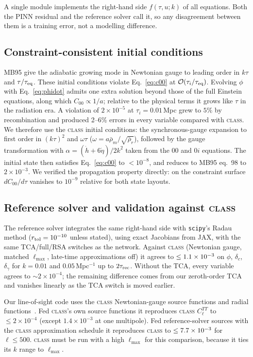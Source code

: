\documentclass[prd,twocolumn,superscriptaddress,nofootinbib,floatfix]{revtex4-2}
\newcommand{\taurec}{\tau_{\rm rec}}
\begin{document}
A single module implements the right-hand side $f(\tau,u;k)$ of all equations. Both the PINN residual and the reference solver call it, so any disagreement between them is a training error, not a modelling difference.

\subsection{Constraint-consistent initial conditions}\label{sec:ics}
MB95 give the adiabatic growing mode in Newtonian gauge to leading order in $k\tau$ and $\tau/\tau_{\rm eq}$. These initial conditions violate Eq.~\eqref{eq:c00} at $\mathcal{O}(\tau_i/\tau_{\rm eq})$. Evolving $\phi$ with Eq.~\eqref{eq:phidot} admits one extra solution beyond those of the full Einstein equations, along which $C_{00}\propto 1/a$; relative to the physical terms it grows like $\tau$ in the radiation era. A violation of $2\times10^{-5}$ at $\tau_i=0.01$\,Mpc grew to $5\%$ by recombination and produced 2--6\% errors in every variable compared with \textsc{class}. We therefore use the \textsc{class} initial conditions: the synchronous-gauge expansion to first order in $(k\tau)^2$ and $\omega\tau$ ($\omega=a\bar\rho_m/\sqrt{\bar\rho_r}$), followed by the gauge transformation with $\alpha=(\dot h+6\dot\eta)/2k^2$ taken from the $00$ and $0i$ equations. The initial state then satisfies Eq.~\eqref{eq:c00} to $<10^{-8}$, and reduces to MB95 eq.~98 to $2\times10^{-3}$. We verified the propagation property directly: on the constraint surface $dC_{00}/d\tau$ vanishes to $10^{-9}$ relative for both state layouts.

\subsection{Reference solver and validation against \textsc{class}}
The reference solver integrates the same right-hand side with \texttt{scipy}'s Radau method ($r_{\rm tol}=10^{-10}$ unless stated), using exact Jacobians from JAX, with the same TCA/full/RSA switches as the network. Against \textsc{class} (Newtonian gauge, matched $\ell_{\max}$, late-time approximations off) it agrees to $\le1.1\times10^{-3}$ on $\phi$, $\delta_c$, $\delta_\gamma$ for $k=0.01$ and $0.05$\,Mpc$^{-1}$ up to $2\taurec$. Without the TCA, every variable agrees to $\sim2\times10^{-4}$; the remaining difference comes from our zeroth-order TCA and vanishes linearly as the TCA switch is moved earlier.

Our line-of-sight code uses the \textsc{class} Newtonian-gauge source functions and radial functions~\cite{SeljakZaldarriaga1996}. Fed \textsc{class}'s own source functions it reproduces \textsc{class} $C_\ell^{TT}$ to $\le2\times10^{-4}$ (except $1.4\times10^{-3}$ at one multipole). Fed reference-solver sources with the \textsc{class} approximation schedule it reproduces \textsc{class} to $\le7.7\times10^{-3}$ for $\ell\le500$. \textsc{class} must be run with a high $\ell_{\max}$ for this comparison, because it ties its $k$ range to $\ell_{\max}$.
\end{document}
